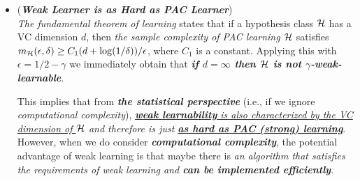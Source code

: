 \documentclass[11pt]{article}
\begin{document}
\begin{itemize}
\item \begin{remark} (\textbf{\emph{Weak Learner is as Hard as PAC Learner}})\\
\emph{The fundamental theorem of learning}  states that if a hypothesis class ${\mathcal H}$ has a VC dimension $d$, then \emph{the sample complexity of PAC learning ${\mathcal H}$} satisfies $m_{{\mathcal H}}(\epsilon, \delta) \ge  C_1 (d+\log(1/\delta))/\epsilon$, where $C_1$ is a constant. Applying this with $\epsilon = 1/2 - \gamma$ we immediately obtain that \emph{\textbf{if $d = \infty$ then ${\mathcal H}$ is not $\gamma$-weak-learnable}}. 

This implies that from \emph{\textbf{the statistical perspective}} (i.e., if we ignore \emph{computational complexity}), \emph{\underline{\textbf{weak learnability} is also characterized by the VC dimension of ${\mathcal H}$} and therefore is just \underline{\textbf{as hard as PAC (strong) learning}}}. However, when we do consider \emph{\textbf{computational complexity}}, the potential advantage of weak learning is that maybe there is \emph{an algorithm that satisfies the requirements of weak learning and \textbf{can be implemented efficiently}}.
\end{remark}
\end{itemize}
\end{document}
